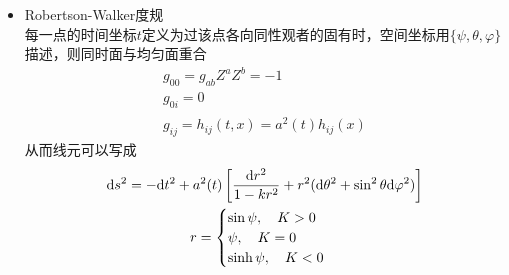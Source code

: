 \begin{itemize}
\begin{itemize}
    \end{itemize}
    从而可以穷尽均匀面的局域空间几何
    \begin{itemize}
        \item $K=0$
        \begin{gather*}
            \d l^2=\d x^2+\d y^2+\d z^2=\d \psi^2+\psi^2(\d \theta^2+\sin^2\theta \d \varphi^2)
        \end{gather*}
        \item $K>0$：半径为$R$的3维球面
        \begin{gather*}
            \d l^2=R^2[\d \psi^2+\sin^2 \psi(\d \theta^2+\sin^2\theta \d \varphi^2)]
            \\
            {\hat{R}_{ab}}^{cd}=2R^{-2} {\delta_a}^{[c} {\delta_b}^{d]}
        \end{gather*}
        \item $K<0$：3维旋转双曲面
        \begin{gather*}
            t^2-x^2-y^2-z^2=\xi^2
            \\
            \d l^2=\xi^2[\d \psi^2+\sinh^2 \psi(\d \theta^2+\sin^2\theta \d \varphi^2)]
            \\
            {\hat{R}_{ab}}^{cd}=-2\xi^{-2} {\delta_a}^{[c} {\delta_b}^{d]}
        \end{gather*}
    \end{itemize}
    \item Robertson-Walker度规\\
        每一点的时间坐标$t$定义为过该点各向同性观者的固有时，空间坐标用$\{\psi, \theta, \varphi\}$描述，则同时面与均匀面重合
        \begin{gather*}
            g_{00}=g_{ab} Z^a Z^b=-1
            \\
            g_{0i}=0
            \\
            g_{ij}=h_{ij}(t, x)=a^2(t)\hat{h}_{ij}(x)
        \end{gather*}
        从而线元可以写成
        \begin{gather*}
            \d s^2=-\d t^2+a^2(t)\left[\frac{\d r^2}{1-kr^2}+r^2(\d \theta^2+\sin^2\theta \d \varphi^2)\right]
            \\
            r=\begin{cases}
                \sin \psi,\quad K>0
                \\
                \psi,\quad K=0
                \\
                \sinh \psi,\quad K<0
            \end{cases}

\end{gather*}
\end{itemize}
